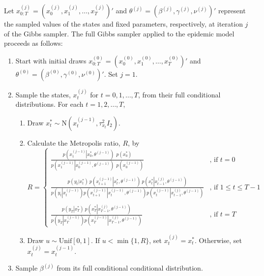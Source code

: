 Let $x^{(j)}_{0:T} = \left(x^{(j)}_0, x^{(j)}_1, \ldots, x^{(j)}_T\right)'$ and $\theta^{(j)} = \left(\beta^{(j)},\gamma^{(j)},\nu^{(j)}\right)'$ represent the sampled values of the states and fixed parameters, respectively, at iteration $j$ of the Gibbs sampler. The full Gibbs sampler applied to the epidemic model proceeds as follows:
\begin{enumerate}
\item Start with initial draws $x^{(0)}_{0:T} = \left(x^{(0)}_0, x^{(0)}_1, \ldots, x^{(0)}_T\right)'$ and $\theta^{(0)} = \left(\beta^{(0)}, \gamma^{(0)}, \nu^{(0)}\right)'$. Set $j = 1$.
\item \label{step:gibbs} Sample the states, $x^{(j)}_t$ for $t = 0,1,\ldots,T$, from their full conditional distributions. For each $t = 1, 2, \ldots, T$,
    \begin{enumerate}
    \item Draw $x^*_t \sim \mbox{N}\left(x^{(j-1)}_t,\tau^2_{x_t} I_2\right)$.
    \item Calculate the Metropolis ratio, $R$, by
      \[R = \left\{
      \begin{array}{cl}
      \frac{p\left(x^{(j-1)}_1\left|x^*_0,\theta^{(j-1)}\right. \right)\ \ p\left(x^*_0\right)}{p\left(x^{(j-1)}_1\left|x^{(j-1)}_0,\theta^{(j-1)}\right.\right)\ \ p\left(x^{(j-1)}_0\right)} & \mbox{, if } t = 0 \\
      & \\
      \frac{p\left(y_t|x^*_t\right)\ p\left( \left. x^{(j-1)}_{t+1} \right| x^*_t,\theta^{(j-1)}  \right)\ p\left(x^*_t \left| x^{(j)}_{t-1},\theta^{(j-1)} \right. \right)}{p\left(y_t \left|x^{(j-1)}_t \right. \right) p\left(x^{(j-1)}_{t+1}\left|x^{(j-1)}_t,\theta^{(j-1)}\right.\right) p\left(x^{(j-1)}_t\left|x^{(j)}_{t-1},\theta^{(j-1)}\right.\right)}
      & \mbox{, if } 1 \le t \le T-1 \\
      & \\
      \frac{p\left(y_T \left|x^*_T \right. \right)\  p\left(x^*_T \left|x^{(j)}_{T-1},\theta^{(j-1)} \right. \right)}{p\left(y_T \left|x^{(j-1)}_T \right. \right)p\left(x^{(j-1)}_T\left|x^{(j)}_{T-1},\theta^{(j-1)} \right. \right)} & \mbox{, if } t = T
      \end{array}
      \right.\]
    \item Draw $u \sim \mbox{Unif}[0,1]$. If $u < \min\{1, R\}$, set $x^{(j)}_t = x^*_t$. Otherwise, set $x^{(j)}_t = x^{(j-1)}_t$.
    \end{enumerate}
\item \label{step:beta} Sample $\beta^{(j)}$ from its full conditional conditional distribution.

\end{enumerate}
